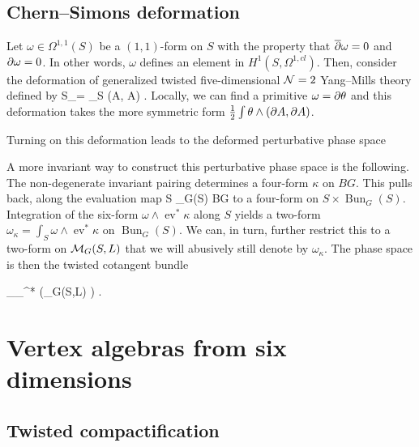 \documentclass[11pt]{amsart}
\renewcommand{\op}{\operatorname}
\begin{document}
\subsection{Chern--Simons deformation}

Let $\omega \in \Omega^{1,1}(S)$ be a $(1,1)$-form on $S$ with the property that $\overline{\partial} \omega = 0$ and $\partial \omega = 0$.
In other words, $\omega$ defines an element in $H^1(S, \Omega^{1,cl})$.
Then, consider the deformation of generalized twisted five-dimensional $\mathcal N=2$ Yang--Mills theory defined by
\beqn
S_\theta =  \int_{\R \times S} \omega \wedge (A, \del A) .
\eeqn
Locally, we can find a primitive $\omega = \partial \theta$ and this deformation takes the more symmetric form $\frac12 \int \theta \wedge (\partial A, \partial A)$.

Turning on this deformation leads to the deformed perturbative phase space
\beqn
{}
\eeqn
A more invariant way to construct this perturbative phase space is the following.
The non-degenerate invariant pairing determines a four-form $\kappa$ on $BG$.
This pulls back, along the evaluation map
\beqn
\op{ev} \colon S \times \op{Bun}_G(S) \to BG 
\eeqn
to a four-form on $S \times \op{Bun}_G(S)$.
Integration of the six-form $\omega \wedge \op{ev}^*\kappa$ along $S$ yields a two-form $\omega_{\kappa} = \int_S \omega \wedge \op{ev}^*\kappa$ on $\op{Bun}_G(S)$.
We can, in turn, further restrict this to a two-form on $\mathcal M_{G}(S,L)$ that we will abusively still denote by $\omega_{\kappa}$.
The phase space is then the twisted cotangent bundle

\beqn\label{eqn:5dphase}
\T_{\omega_{\kappa}}^* \left(\cM_{G}(S,L) \right) .
\eeqn

\section{Vertex algebras from six dimensions}

\subsection{Twisted compactification}
\end{document}
